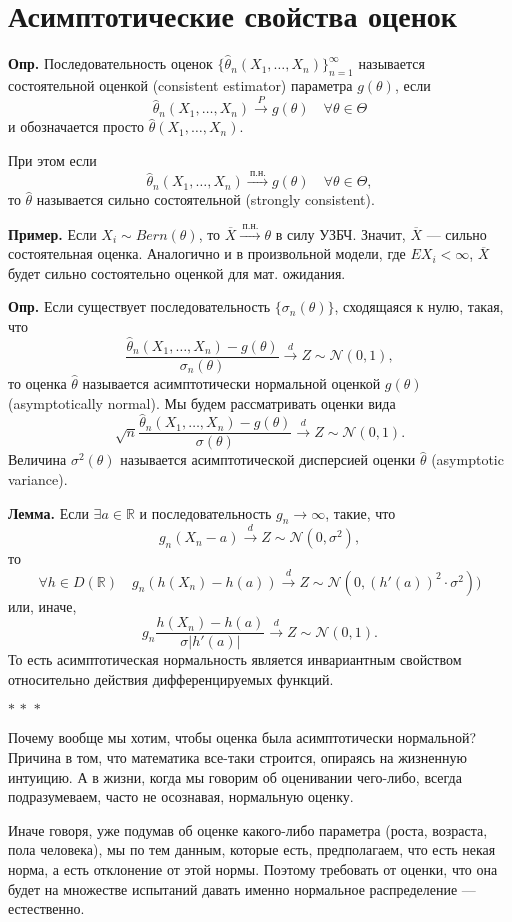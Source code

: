 \documentclass[a4paper,12pt]{article}
\newcommand{\thetah}{\hat\theta}
\newcommand{\bX}{\overline X}
\newcommand{\R}{\mathbb{R}}
\newcommand{\threestars}{\begin{center}$ {\ast}\,{\ast}\,{\ast} $\end{center}}
\newcommand{\myarrow}[1]{\xrightarrow{\ #1\ }}
\newcounter{th-counter}
\newcommand{\ex}{\par\noindent
	\textbf{Пример.} }
\begin{document}
\section*{Асимптотические свойства оценок} 
\textbf{Опр.} Последовательность оценок $\{\thetah_n(X_1,\ldots, X_n)\}_{n=1}^\infty$ называется состоятельной оценкой (consistent estimator) параметра $g(\theta)$, если
$$\thetah_n(X_1, \ldots, X_n) \myarrow{P} g(\theta) \quad \forall \theta \in \Theta$$
и обозначается просто $\thetah(X_1,\ldots, X_n)$.

При этом если
$$\thetah_n(X_1, \ldots, X_n) \myarrow{\text{п.н.}} g(\theta) \quad \forall \theta \in \Theta,$$
то $\thetah$ называется сильно состоятельной (strongly consistent).

\ex Если $X_i \sim Bern(\theta)$, то $\bX \myarrow{\text{п.н.}} \theta$ в силу УЗБЧ. Значит, $\bX$ --- сильно состоятельная оценка. Аналогично и в произвольной модели, где $EX_i < \infty$, $\bX$ будет сильно состоятельно оценкой для мат. ожидания.

\textbf{Опр.} Если существует последовательность $\{\sigma_n(\theta)\}$, сходящаяся к нулю, такая, что
$$\frac{\thetah_n(X_1, \ldots, X_n) - g(\theta)}{\sigma_n(\theta)} \myarrow{d} Z \sim \mathcal{N}(0,1),$$
то оценка $\thetah$ называется асимптотически нормальной оценкой $g(\theta)$ (asymptotically normal). Мы будем рассматривать оценки вида
$$\sqrt{n}\frac{\thetah_n(X_1, \ldots, X_n) - g(\theta)}{\sigma(\theta)} \myarrow{d} Z \sim \mathcal{N}(0,1).$$
Величина $\sigma^2(\theta)$ называется асимптотической дисперсией оценки $\thetah$ (asymptotic variance).

\textbf{Лемма.} Если $\exists a \in \R$ и последовательность $g_n \rightarrow \infty$, такие, что
$$g_n(X_n-a) \myarrow{d} Z \sim \mathcal{N}(0,\sigma^2),$$
то 
$$\forall h \in D(\R) \quad g_n(h(X_n)-h(a)) \myarrow{d} Z \sim \mathcal{N}(0, (h'(a))^2\cdot \sigma^2))$$
или, иначе,
$$g_n \frac{h(X_n)-h(a)}{\sigma |h'(a)|} \myarrow{d} Z \sim \mathcal{N}(0,1).$$
То есть асимптотическая нормальность является инвариантным свойством относительно действия дифференцируемых функций.

\threestars
Почему вообще мы хотим, чтобы оценка была асимптотически нормальной? Причина в том, что математика все-таки строится, опираясь на жизненную интуицию. А в жизни, когда мы говорим об оценивании чего-либо, всегда подразумеваем, часто не осознавая, нормальную оценку.

Иначе говоря, уже подумав об оценке какого-либо параметра (роста, возраста, пола человека), мы по тем данным, которые есть, предполагаем, что есть некая норма, а есть отклонение от этой нормы. Поэтому требовать от оценки, что она будет на множестве испытаний давать именно нормальное распределение --- естественно.
\end{document}
